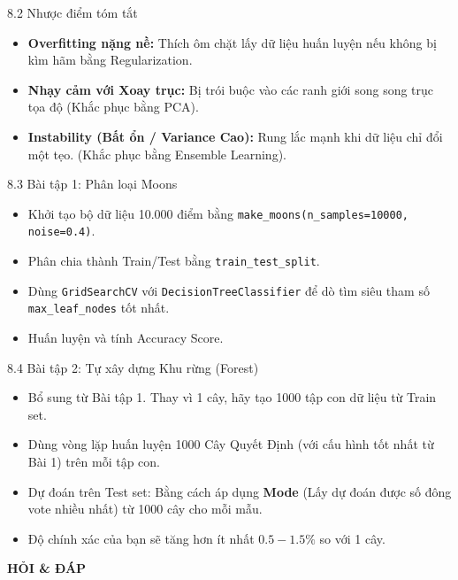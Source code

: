 \documentclass[aspectratio=169, 12pt]{beamer}
\begin{document}
\begin{frame}{8.2 Nhược điểm tóm tắt}
    \begin{itemize}
        \item \textbf{Overfitting nặng nề:} Thích ôm chặt lấy dữ liệu huấn luyện nếu không bị kìm hãm bằng Regularization.
        \item \textbf{Nhạy cảm với Xoay trục:} Bị trói buộc vào các ranh giới song song trục tọa độ (Khắc phục bằng PCA).
        \item \textbf{Instability (Bất ổn / Variance Cao):} Rung lắc mạnh khi dữ liệu chỉ đổi một tẹo. (Khắc phục bằng Ensemble Learning).
    \end{itemize}
\end{frame}

\begin{frame}{8.3 Bài tập 1: Phân loại Moons}
    \begin{itemize}
        \item Khởi tạo bộ dữ liệu 10.000 điểm bằng \texttt{make\_moons(n\_samples=10000, noise=0.4)}.
        \item Phân chia thành Train/Test bằng \texttt{train\_test\_split}.
        \item Dùng \texttt{GridSearchCV} với \texttt{DecisionTreeClassifier} để dò tìm siêu tham số \texttt{max\_leaf\_nodes} tốt nhất.
        \item Huấn luyện và tính Accuracy Score.
    \end{itemize}
\end{frame}

\begin{frame}{8.4 Bài tập 2: Tự xây dựng Khu rừng (Forest)}
    \begin{itemize}
        \item Bổ sung từ Bài tập 1. Thay vì 1 cây, hãy tạo 1000 tập con dữ liệu từ Train set.
        \item Dùng vòng lặp huấn luyện 1000 Cây Quyết Định (với cấu hình tốt nhất từ Bài 1) trên mỗi tập con.
        \item Dự đoán trên Test set: Bằng cách áp dụng \textbf{Mode} (Lấy dự đoán được số đông vote nhiều nhất) từ 1000 cây cho mỗi mẫu.
        \item Độ chính xác của bạn sẽ tăng hơn ít nhất $0.5 - 1.5\%$ so với 1 cây.
    \end{itemize}
\end{frame}

\begin{frame}
    \centering
    \Huge \textbf{HỎI \& ĐÁP}
\end{frame}
\end{document}
